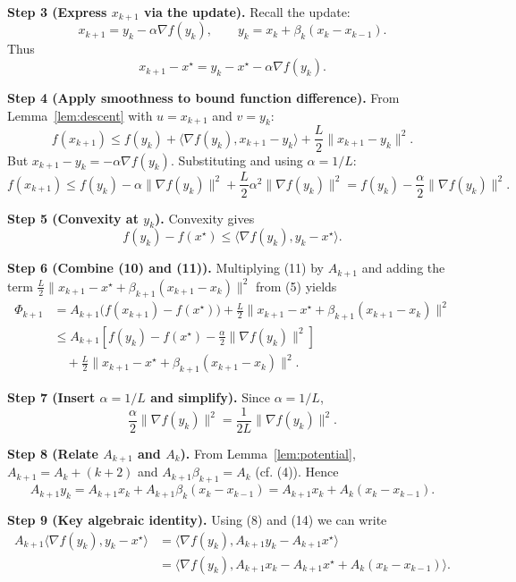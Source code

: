 \documentclass{article}
\newcommand{\grad}{\nabla}
\begin{document}
\medskip
\noindent\textbf{Step 3 (Express \(x_{k+1}\) via the update).}  
Recall the update:
\[
x_{k+1}=y_k-\alpha\grad f(y_k),\qquad y_k = x_k+\beta_k(x_k-x_{k-1}).
\tag{7}
\]
Thus
\[
x_{k+1}-x^\star = y_k-x^\star-\alpha\grad f(y_k).
\tag{8}
\]

\medskip
\noindent\textbf{Step 4 (Apply smoothness to bound function difference).}  
From Lemma~\ref{lem:descent} with \(u=x_{k+1}\) and \(v=y_k\):
\[
f(x_{k+1}) \le f(y_k)+\langle \grad f(y_k),x_{k+1}-y_k\rangle 
               +\frac{L}{2}\|x_{k+1}-y_k\|^2 .
\tag{9}
\]
But \(x_{k+1}-y_k = -\alpha\grad f(y_k)\). Substituting and using \(\alpha=1/L\):
\[
f(x_{k+1}) \le f(y_k) -\alpha\|\grad f(y_k)\|^2
               +\frac{L}{2}\alpha^2\|\grad f(y_k)\|^2
          = f(y_k) -\frac{\alpha}{2}\|\grad f(y_k)\|^2 .
\tag{10}
\]

\medskip
\noindent\textbf{Step 5 (Convexity at \(y_k\)).}  
Convexity gives
\[
f(y_k)-f(x^\star) \le \langle \grad f(y_k), y_k-x^\star\rangle .
\tag{11}
\]

\medskip
\noindent\textbf{Step 6 (Combine (10) and (11)).}  
Multiplying (11) by \(A_{k+1}\) and adding the term \(\frac{L}{2}\|x_{k+1}-x^\star+\beta_{k+1}(x_{k+1}-x_k)\|^2\) from (5) yields
\[
\begin{aligned}
\Phi_{k+1}
&= A_{k+1}\bigl(f(x_{k+1})-f(x^\star)\bigr)
   +\frac{L}{2}\|x_{k+1}-x^\star+\beta_{k+1}(x_{k+1}-x_k)\|^2\\
&\le A_{k+1}\!\left[f(y_k)-f(x^\star)-\frac{\alpha}{2}\|\grad f(y_k)\|^2\right] \\
&\quad +\frac{L}{2}\|x_{k+1}-x^\star+\beta_{k+1}(x_{k+1}-x_k)\|^2 .
\end{aligned}
\tag{12}
\]

\medskip
\noindent\textbf{Step 7 (Insert \(\alpha=1/L\) and simplify).}  
Since \(\alpha=1/L\),
\[
\frac{\alpha}{2}\|\grad f(y_k)\|^2 = \frac{1}{2L}\|\grad f(y_k)\|^2 .
\tag{13}
\]

\medskip
\noindent\textbf{Step 8 (Relate \(A_{k+1}\) and \(A_k\)).}  
From Lemma~\ref{lem:potential}, \(A_{k+1}=A_k+\! (k+2)\) and
\(A_{k+1}\beta_{k+1}=A_k\) (cf. (4)). Hence
\[
A_{k+1}y_k = A_{k+1}x_k + A_{k+1}\beta_k(x_k-x_{k-1})
          = A_{k+1}x_k + A_k (x_k-x_{k-1}) .
\tag{14}
\]

\medskip
\noindent\textbf{Step 9 (Key algebraic identity).}  
Using (8) and (14) we can write
\[
\begin{aligned}
A_{k+1}\langle \grad f(y_k), y_k-x^\star\rangle
 &= \langle \grad f(y_k), A_{k+1}y_k - A_{k+1}x^\star\rangle\\
 &= \langle \grad f(y_k), A_{k+1}x_k - A_{k+1}x^\star + A_k(x_k-x_{k-1})\rangle .
\end{aligned}
\tag{15}
\]
\end{document}
